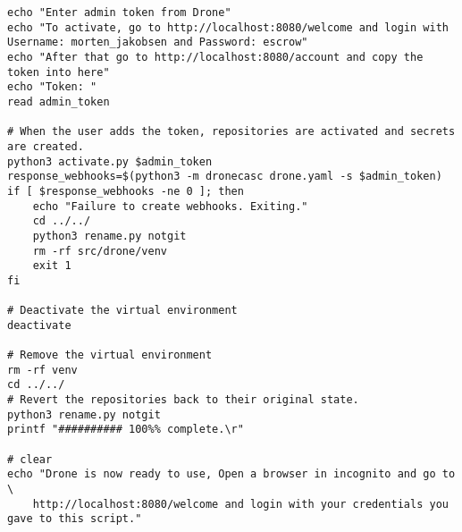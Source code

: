 \begin{verbatim}
echo "Enter admin token from Drone"
echo "To activate, go to http://localhost:8080/welcome and login with Username: morten_jakobsen and Password: escrow"
echo "After that go to http://localhost:8080/account and copy the token into here"
echo "Token: "
read admin_token

# When the user adds the token, repositories are activated and secrets are created.
python3 activate.py $admin_token
response_webhooks=$(python3 -m dronecasc drone.yaml -s $admin_token)
if [ $response_webhooks -ne 0 ]; then
    echo "Failure to create webhooks. Exiting."
    cd ../../
    python3 rename.py notgit
    rm -rf src/drone/venv
    exit 1
fi

# Deactivate the virtual environment
deactivate

# Remove the virtual environment
rm -rf venv
cd ../../
# Revert the repositories back to their original state.
python3 rename.py notgit
printf "########## 100%% complete.\r"

# clear
echo "Drone is now ready to use, Open a browser in incognito and go to \ 
    http://localhost:8080/welcome and login with your credentials you gave to this script."
\end{verbatim}



